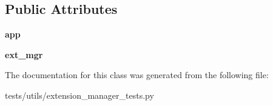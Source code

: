 \subsection*{Public Attributes}
\begin{DoxyCompactItemize}
\item 
\hypertarget{classtests_1_1utils_1_1extension__manager__tests_1_1ExtensionSettingsTestCase_ad69eeb2a244780bb42fa81a4a5eca1b7}{{\bfseries app}}\label{classtests_1_1utils_1_1extension__manager__tests_1_1ExtensionSettingsTestCase_ad69eeb2a244780bb42fa81a4a5eca1b7}

\item 
\hypertarget{classtests_1_1utils_1_1extension__manager__tests_1_1ExtensionSettingsTestCase_ac2c652333c649703f486eeaf7233c3c9}{{\bfseries ext\+\_\+mgr}}\label{classtests_1_1utils_1_1extension__manager__tests_1_1ExtensionSettingsTestCase_ac2c652333c649703f486eeaf7233c3c9}

\end{DoxyCompactItemize}


The documentation for this class was generated from the following file\+:\begin{DoxyCompactItemize}
\item 
tests/utils/extension\+\_\+manager\+\_\+tests.\+py\end{DoxyCompactItemize}
